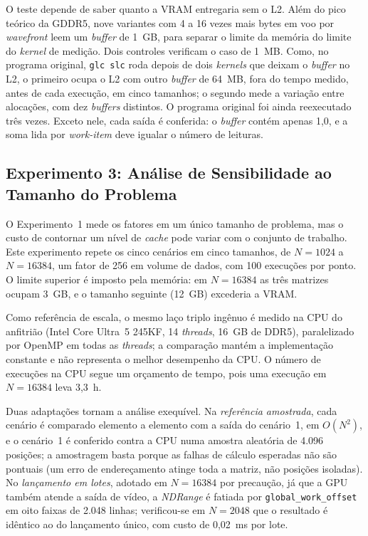 \documentclass[12pt]{article}
\begin{document}
O teste depende de saber quanto a VRAM entregaria sem o L2. Além do pico teórico da GDDR5, nove variantes com 4 a 16 vezes mais bytes em voo por \textit{wavefront} leem um \textit{buffer} de 1~GB, para separar o limite da memória do limite do \textit{kernel} de medição. Dois controles verificam o caso de 1~MB. Como, no programa original, \texttt{glc slc} roda depois de dois \textit{kernels} que deixam o \textit{buffer} no L2, o primeiro ocupa o L2 com outro \textit{buffer} de 64~MB, fora do tempo medido, antes de cada execução, em cinco tamanhos; o segundo mede a variação entre alocações, com dez \textit{buffers} distintos. O programa original foi ainda reexecutado três vezes. Exceto nele, cada saída é conferida: o \textit{buffer} contém apenas 1,0, e a soma lida por \textit{work-item} deve igualar o número de leituras.

\subsection{Experimento 3: Análise de Sensibilidade ao Tamanho do Problema}
\label{sec:met-sens}

O Experimento~1 mede os fatores em um único tamanho de problema, mas o custo de
contornar um nível de \textit{cache} pode variar com o conjunto de trabalho.
Este experimento repete os cinco cenários em
cinco tamanhos, de $N=1024$ a $N=16384$, um fator de 256 em volume de dados, com
100 execuções por ponto. O limite superior é imposto pela memória: em $N=16384$
as três matrizes ocupam 3~GB, e o tamanho seguinte (12~GB) excederia a VRAM.

Como referência de escala, o mesmo laço triplo ingênuo é medido na CPU do
anfitrião (Intel Core Ultra~5 245KF, 14 \textit{threads}, 16~GB de DDR5),
paralelizado por OpenMP em todas as \textit{threads}; a comparação mantém a
implementação constante e não representa o melhor desempenho da CPU. O número de
execuções na CPU segue um orçamento de tempo, pois uma execução em $N=16384$ leva 3,3~h.

Duas adaptações tornam a análise exequível. Na \emph{referência amostrada},
cada cenário é comparado elemento a elemento com a saída do cenário~1, em
$O(N^2)$, e o cenário~1 é conferido contra a CPU numa amostra aleatória de 4.096
posições; a amostragem basta porque as falhas de cálculo esperadas não são
pontuais (um erro de endereçamento atinge toda a matriz, não posições isoladas). No
\emph{lançamento em lotes}, adotado em $N=16384$ por precaução, já que a GPU
também atende a saída de vídeo, a \textit{NDRange} é fatiada por
\texttt{global\_work\_offset} em oito faixas de 2.048 linhas; verificou-se em
$N=2048$ que o resultado é idêntico ao do lançamento único, com custo de 0,02~ms
por lote.
\end{document}
